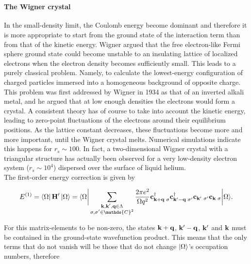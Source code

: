 \documentclass{homework}
\begin{document}
\blanky \\

\paragraph{\textbf{The Wigner crystal}}

In the small-density limit, the Coulomb energy become dominant and therefore it is more appropriate to start from the ground state of the interaction term than from that of the kinetic energy. Wigner argued that the free electron-like Fermi sphere ground state could become unstable to an insulating lattice of localized electrons when the electron density becomes sufficiently small. This leads to a purely classical problem. Namely, to calculate the lowest-energy configuration of charged particles immersed into a homogeneous background of opposite charge. This problem was first addressed by Wigner in 1934 as that of an inverted alkali metal, and he argued that at low enough densities the electrons would form a crystal. A consistent theory has of course to take into account the kinetic energy, leading to zero-point fluctuations of the electrons around their equilibrium positions. As the lattice constant decreases, these fluctuations become more and more important, until the Wigner crystal melts. Numerical simulations indicate this happens for $r_s \sim 100$. In fact, a two-dimensional Wigner crystal with a triangular structure has actually been observed for a very low-density electron system ($r_s\sim 10^4$) dispersed over the surface of liquid helium. \\

The first-order energy correction is given by 

$$
    E^{(1)} = \bra{\Omega} {{\bf H}}' \ket{\Omega} = \langle {\Omega} \bigg|  \sum_{\substack{{\bf k},{\bf k}',{\bf q} \in \Lambda\\
    \sigma, \sigma' \in \mathds{C}^2}} \frac{2\pi e^2}{\Omega q^2} {\bf c}_{{\bf k}+{\bf q} \blanky \sigma}^\dagger {\bf c}_{{\bf k}'-{\bf q} \blanky \sigma'}^\dagger {\bf c}_{{\bf k}' \blanky \sigma'} {\bf c}_{{\bf k} \blanky \sigma} \bigg| {\Omega} \rangle.
$$

For this matrix-elements to be non-zero, the states ${\bf k}+{\bf q}$, ${\bf k}'-{\bf q}$, ${\bf k}'$ and ${\bf k}$ must be contained in the ground-state wavefunction product. This means that the only terms that do not vanish will be those that do not change $\ket{\Omega}$'s occupation numbers, therefore
\end{document}
